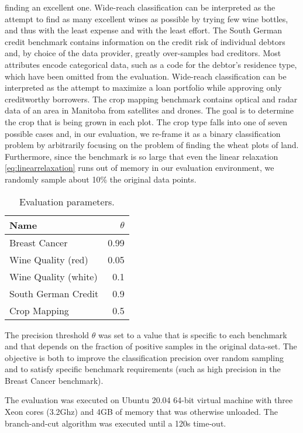 \documentclass[11pt]{article}
\theoremstyle{definition}
\begin{document}
finding an excellent one.
Wide-reach classification can be interpreted as the
attempt to find as many excellent wines as possible
by trying few wine bottles, and thus
with the least expense and with the least effort.
The South German credit benchmark \cite{southgermancredit}
contains information on the credit risk of individual debtors
and, by choice of the data provider, greatly over-samples bad creditors.
Most attributes encode categorical data, such as a code for the 
debtor's residence type, which have been omitted from the evaluation.
Wide-reach classification can be interpreted as the attempt
to maximize a loan portfolio while approving 
only creditworthy borrowers.
The crop mapping benchmark \cite{crops} contains optical and radar
data of an area in Manitoba from satellites and drones.
The goal is to determine the crop that is being grown
in each plot.
The crop type falls into one of seven possible cases and,
in our evaluation, we re-frame it as a binary classification problem
by arbitrarily focusing on the problem of finding the wheat plots of land.
Furthermore, since the benchmark is so large that 
even the linear relaxation \eqref{eq:linearrelaxation}
runs out of memory in our evaluation environment, 
we randomly sample about 10\% the original data points.

\begin{table}
\centering
\begin{tabular}{l|r}
{\bf Name\/} & $\theta$ \\ \hline
Breast Cancer & 0.99  \\ \hline 
Wine Quality (red) & 0.05  \\ \hline
Wine Quality (white) & 0.1  \\ \hline
South German Credit & 0.9  \\ \hline
Crop Mapping & 0.5  \\ \hline
\end{tabular}
\caption{Evaluation parameters.}
\label{tab:params}
\end{table}
The precision threshold $\theta$ was set to a value that is specific 
to each benchmark and that depends on the fraction of positive samples
in the original data-set. 
The objective is both to improve the classification precision over
random sampling and to satisfy specific benchmark requirements
(such as high precision in the Breast Cancer benchmark).

The evaluation was executed on Ubuntu 20.04 64-bit virtual machine
with three Xeon cores (3.2Ghz) and 4GB of memory that was otherwise unloaded.
The branch-and-cut algorithm was executed until a 120s time-out.
\end{document}
